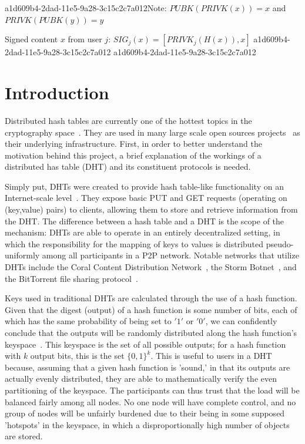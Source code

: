 \documentclass[12pt]{article}
\begin{document}
a1d609b4-2dad-11e5-9a28-3c15c2c7a012Note: $PUBK(PRIVK(x)) = x$ and $PRIVK(PUBK(y)) = y$~

Signed content $x$ from user $j$: $SIG_j(x) = \left[ PRIVK_j( H(x) ), x \right]$
a1d609b4-2dad-11e5-9a28-3c15c2c7a012
a1d609b4-2dad-11e5-9a28-3c15c2c7a012\section{Introduction}
\par Distributed hash tables are currently one of the hottest topics in the cryptography space~\cite{Stoica:2001dj,Rowstron:2001ea,Ratnasamy:2001wn}. They are used in many large scale open sources projects~\cite{Freitas:2013tb,Xu:2010vs,Perfitt:2010fh} as their underlying infrastructure. First, in order to better understand the motivation behind this project, a brief explanation of the workings of a distributed has table (DHT) and its constituent protocols is needed.

\par Simply put, DHTs were created to provide hash table-like functionality on an Internet-scale level~\cite{Ratnasamy:2001wn}. They expose basic PUT and GET requests (operating on (key,value) pairs) to clients, allowing them to store and retrieve information from the DHT. The difference between a hash table and a DHT is the scope of the mechanism: DHTs are able to operate in an entirely decentralized setting, in which the responsibility for the mapping of keys to values is distributed pseudo-uniformly among all participants in a P2P network. Notable networks that utilize DHTs include the Coral Content Distribution Network~\cite{Freedman:2004vb}, the Storm Botnet~\cite{Holz:2008uk}, and the BitTorrent file sharing protocol~\cite{Cohen:y1_8mBnw}.

\par Keys used in traditional DHTs are calculated through the use of a hash function. Given that the digest (output) of a hash function is some number of bits, each of which has the same probability of being set to $'1'$ or $'0'$, we can confidently conclude that the outputs will be randomly distributed along the hash function's keyspace~. This keyspace is the set of all possible outputs; for a hash function with $k$ output bits, this is the set $\{0,1\}^k$. This is useful to users in a DHT because, assuming that a given hash function is 'sound,' in that its outputs are actually evenly distributed, they are able to mathematically verify the even partitioning of the keyspace. The participants can thus trust that the load will be balanced fairly among all nodes. No one node will have complete control, and no group of nodes will be unfairly burdened due to their being in some supposed 'hotspots' in the keyspace, in which a disproportionally high number of objects are stored.~
\end{document}
